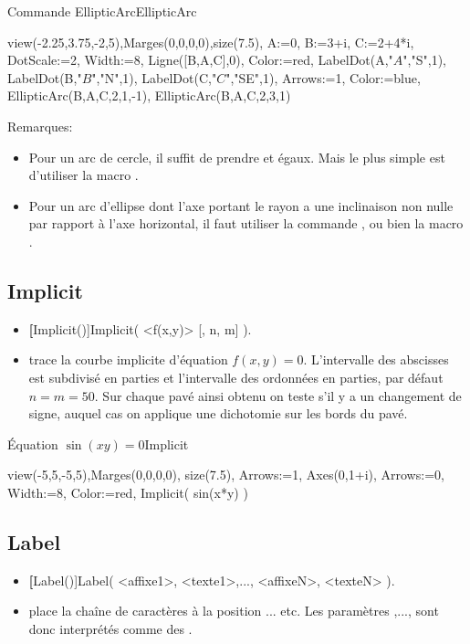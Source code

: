 \begin{demo}{Commande EllipticArc}{EllipticArc}
\begin{texgraph}[name=EllipticArc]
view(-2.25,3.75,-2,5),Marges(0,0,0,0),size(7.5),
A:=0, B:=3+i, C:=2+4*i, DotScale:=2, Width:=8,
Ligne([B,A,C],0), Color:=red,
LabelDot(A,"$A$","S",1), LabelDot(B,"$B$","N",1),
LabelDot(C,"$C$","SE",1), Arrows:=1, Color:=blue,
EllipticArc(B,A,C,2,1,-1), EllipticArc(B,A,C,2,3,1)
\end{texgraph}
\end{demo}

Remarques: 
\begin{itemize}
 \item Pour un arc de cercle, il suffit de prendre  et  égaux. Mais le plus simple est d'utiliser la macro .
 \item Pour un arc d'ellipse dont l'axe portant le rayon  a une inclinaison non nulle par rapport à l'axe horizontal, il faut utiliser la commande , ou bien la macro .
\end{itemize}

\subsection{Implicit}\label{cmdImplicit}
\begin{itemize}
 \item \util \textbf[Implicit()]{Implicit( <f(x,y)> [, n, m] )}.
 \item \desc trace la courbe implicite d'équation $f(x,y)=0$. L'intervalle des abscisses est subdivisé en  parties et l'intervalle des ordonnées en  parties, par défaut $n=m=50$. Sur chaque pavé ainsi obtenu on teste s'il y a un changement de signe, auquel cas on applique une dichotomie sur les bords du pavé.
\end{itemize}

\begin{demo}{\'Equation $\sin(xy)=0$}{Implicit}
\begin{texgraph}[name=Implicit]
view(-5,5,-5,5),Marges(0,0,0,0), size(7.5), 
Arrows:=1, Axes(0,1+i), Arrows:=0,
Width:=8, Color:=red,
Implicit( sin(x*y) )
\end{texgraph}
\end{demo}

\subsection{Label}\label{cmdLabel}
\begin{itemize}
 \item \util \textbf[Label()]{Label( <affixe1>, <texte1>,..., <affixeN>, <texteN> )}.
 \item \desc place la chaîne de caractères  à la position  ... etc. Les paramètres ,...,  sont donc interprétés comme des .
\end{itemize}

